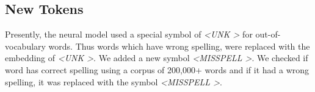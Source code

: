 \documentclass[11pt,a4paper]{article}
\newcommand{\acomment}[1]{{\bf{\color{blue}{{[Aman: #1]}}}}}
\begin{document}

\subsection{New Tokens}

Presently, the neural model used a special symbol of \textit{\textless UNK \textgreater} for out-of-vocabulary words. Thus words which have wrong spelling, were replaced with the embedding of \textit{\textless UNK \textgreater}. We added a new symbol \textit{\textless MISSPELL \textgreater}. We checked if word has correct spelling using a corpus of 200,000+ words and if it had a wrong spelling, it was replaced with the symbol \textit{\textless MISSPELL \textgreater}.\\

\begin{table}[]
  \centering
  \caption{Scores of new model (with \textless MISSPELL\textgreater token) and old model on essays with $20\%$ misspelled words.}
  \label{misp_diff}
  \end{table}
  
  

\end{document}
